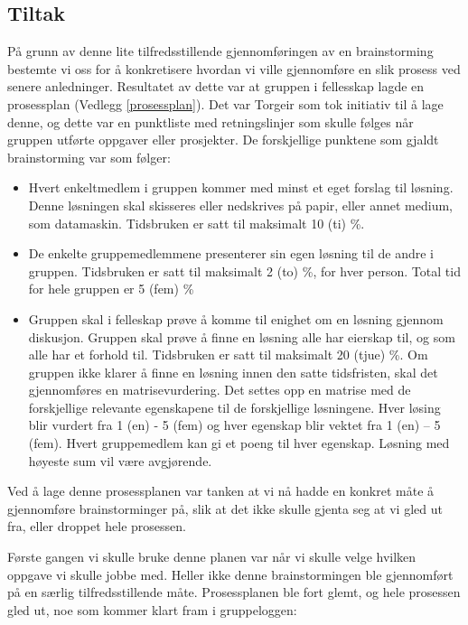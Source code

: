 \subsection{Tiltak}
På grunn av denne lite tilfredsstillende gjennomføringen av en brainstorming bestemte vi oss for å konkretisere hvordan vi ville gjennomføre en slik prosess ved senere anledninger. Resultatet av dette var at gruppen i fellesskap lagde en prosessplan (Vedlegg \ref{prosessplan}). Det var Torgeir som tok initiativ til å lage denne, og dette var en punktliste med retningslinjer som skulle følges når gruppen utførte oppgaver eller prosjekter. De forskjellige punktene som gjaldt brainstorming var som følger:
\begin{itemize}
\item Hvert enkeltmedlem i gruppen kommer med minst et eget forslag til løsning. Denne løsningen skal skisseres eller nedskrives på papir, eller annet medium, som datamaskin. Tidsbruken er satt til maksimalt 10 (ti) \%.

\item De enkelte gruppemedlemmene presenterer sin egen løsning til de andre i gruppen. Tidsbruken er satt til maksimalt 2 (to) \%, for hver person. Total tid for hele gruppen er 5 (fem) \%
 
\item Gruppen skal i felleskap prøve å komme til enighet om en løsning gjennom diskusjon. Gruppen skal prøve å finne en løsning alle har eierskap til, og som alle har et forhold til. Tidsbruken er satt til maksimalt 20 (tjue) \%. Om gruppen ikke klarer å finne en løsning innen den satte tidsfristen, skal det gjennomføres en matrisevurdering. Det settes opp en matrise med de forskjellige relevante egenskapene til de forskjellige løsningene. Hver løsing blir vurdert fra 1 (en) - 5 (fem) og hver egenskap blir vektet fra 1 (en) – 5 (fem). Hvert gruppemedlem kan gi et poeng til hver egenskap. Løsning med høyeste sum vil være avgjørende.
\end{itemize}
Ved å lage denne prosessplanen var tanken at vi nå hadde en konkret måte å gjennomføre brainstorminger på, slik at det ikke skulle gjenta seg at vi gled ut fra, eller droppet hele prosessen.

Første gangen vi skulle bruke denne planen var når vi skulle velge hvilken oppgave vi skulle jobbe med. Heller ikke denne brainstormingen ble gjennomført på en særlig tilfredsstillende måte. Prosessplanen ble fort glemt, og hele prosessen gled ut, noe som kommer klart fram i gruppeloggen:\newline

